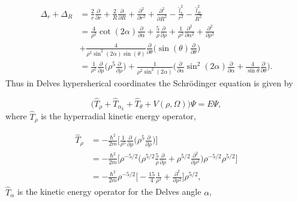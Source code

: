 \documentclass{article}
\numberwithin{equation}{section}
\numberwithin{figure}{section}
\begin{document}
\begin{align}
	\Delta_{r} + \Delta_{R} &= \frac{2}{r}\frac{\partial}{\partial r} +  \frac{2}{R} \frac{\partial}{\partial R}  +\frac{\partial^2}{\partial r^{2}} + \frac{\partial^2}{\partial R^{2}} - \frac{\hat{l}^{2}_{r}}{r^2} - \frac{\hat{l}^{2}_{R}}{R^2} \nonumber \\
									&= \frac{4}{\rho^2} \cot(2\alpha) \frac{\partial}{\partial\alpha} + \frac{5}{\rho} \frac{\partial}{\partial\rho} + \frac{1}{\rho^2} \frac{\partial^2}{\partial\alpha^2} + \frac{\partial^2}{\partial\rho^2} \nonumber \\
									&+ \frac{4}{\rho^2 \sin^2(2\alpha)\sin(\theta)} \frac{\partial}{\partial\theta} \bigg( \sin(\theta) \frac{\partial}{\partial{\theta}} \bigg) \nonumber \\
									&= \frac{1}{\rho^5}\frac{\partial}{\partial\rho} \bigg( \rho^5 \frac{\partial}{\partial\rho} \bigg) + \frac{1}{\rho^2 \sin^2(2\alpha)}  \bigg( \frac{\partial}{\partial\alpha} \sin^2(2\alpha) \frac{\partial}{\partial\alpha} + \frac{4}{\sin\theta} \frac{\partial}{\partial\theta} \bigg).
\end{align}
Thus in Delves hypersherical coordinates the Schr{\"o}dinger equation is given by 

\begin{equation}
\big(\hat{T}_{\rho} + \hat{T}_{\alpha_{k}} + \hat{T}_{\theta} + V(\rho,\Omega)\big) \Psi = E\Psi, 
\end{equation}
where $\hat{T}_{\rho}$ is the hyperradial kinetic energy operator,

\begin{align}
\hat{T}_{\rho} &= -\frac{\hbar^2}{2m} \Big[ \frac{1}{\rho^5}\frac{\partial}{\partial\rho} \Big( \rho^5 \frac{\partial}{\partial\rho} \Big)  \Big] \nonumber\\ 
&= -\frac{\hbar^2}{2m} \Big[ \rho^{-5/2} \Big( \rho^{5/2} \frac{5}{\rho} \frac{\partial}{\partial\rho} + \rho^{5/2} \frac{\partial^2}{\partial\rho^2} \Big) \rho^{-5/2} \rho^{5/2} \Big]\nonumber\\
&= -\frac{\hbar^2}{2m} \rho^{-5/2} \Big[  -\frac{15}{4} \frac{1}{\rho^2} + \frac{\partial^2}{\partial\rho^2} \Big] \rho^{5/2},
\end{align}
$\hat{T}_{\alpha}$ is the kinetic energy operator for the Delves angle $\alpha$,
\end{document}
